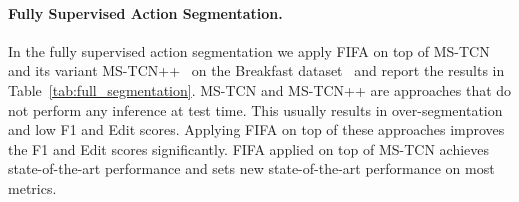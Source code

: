 \begin{comment}
   
\paragraph{Weakly Supervised Action Alignment}
Similar to weakly supervised action segmentation, we apply FIFA on top of CDFL and MuCon for weakly supervised action alignment task and report the results in Table~\ref{tab:weak_alignment}.
Our experiments show that FIFA applied on top of CDFL achieves state-of-the-art or better than state-of-the-art results on MoF and Mof-BG metrics, whereas FIFA applied on top of MuCon achieves state-of-the-art results for IoD and IoU metrics. 

\begin{table}[tb]
    \centering
    \resizebox{\columnwidth}{!}{\begin{tabular}{lcccc}
          \toprule
          Method & MoF & MoF-BG & IoU & IoD \\
          \midrule
          ISBA~\cite{isba} & 53.5 & 51.7 & 35.3 & 52.3\\
          DTW~\cite{d3tw} & 57.0 & - & - & 56.3\\
          CDFL~\cite{CDFL} & 63.0 & 61.4 & 45.8 & \underline{63.9}\\
          ADP~\cite{ghoddoosian2021action} & \underline{64.1} & \textbf{65.5} & 43.0 & - \\
          \midrule
          FIFA + CDFL  & \textbf{65.3} & \underline{64.3} & \underline{46.3} & 61.3\\
          FIFA + MuCon  & 61.4 & 61.2 & \textbf{48.4} & \textbf{64.1}\\
          \bottomrule
       \end{tabular}
     }
    \caption{Results for weakly supervised action alignment on the Breakfast dataset.}
    \label{tab:weak_alignment}
 \end{table}
\end{comment}



\paragraph{Fully Supervised Action Segmentation.}
In the fully supervised action segmentation we apply FIFA on top of MS-TCN~\cite{MS-TCN} and its variant MS-TCN++~\cite{li2020ms} on the Breakfast dataset~\cite{breakfast} and report the results in Table~\ref{tab:full_segmentation}.
MS-TCN and MS-TCN++ are approaches that do not perform any inference at test time. This usually results in over-segmentation and low F1 and Edit scores.
Applying FIFA on top of these approaches improves the F1 and Edit scores significantly.
FIFA applied on top of MS-TCN achieves state-of-the-art performance and sets new state-of-the-art performance on most metrics.

